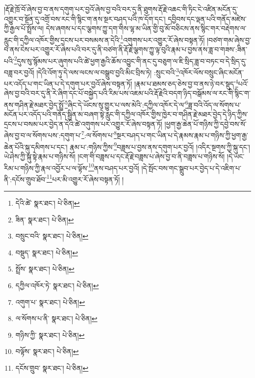 །རྡོ་རྗེ་ཁྲོ་བོ་ཞེས་བྱ་བ་ནས་དགུག་པར་བྱའོ་ཞེས་བྱ་བའི་བར་དུ་ནི་ཐུགས་རྡོ་རྗེ་འཆང་གི་ཏིང་ངེ་འཛིན་མངོན་དུ་འགྱུར་བ་སྔོན་དུ་འགྲོ་བས་རང་གི་སྙིང་ག་ནས་སྔར་བཤད་པའི་ཁ་དོག་དང་། དབྱིབས་དང་ལྡན་པའི་གནོད་མཛེས་ཀྱི་རྒྱལ་པོ་སྤྲོས་ལ། དེས་ཞགས་པ་དང་ལྕགས་ཀྱུ་དག་གིས་ལྷ་མ་ཡིན་གྱི་བུ་མོ་བཅིངས་ནས་སྙིང་གར་བརྡེགས་ལ་རླུང་གི་དཀྱིལ་འཁོར་གྱིས་དྲངས་པར་བསམས་ན་དེའི་\footnote{དེའི་ཚེ་  སྣར་ཐང་།  པེ་ཅིན། }འགུགས་པར་འགྱུར་རོ་ཞེས་བསྟན་ཏོ། །བཙག་གམ་ཞེས་བྱ་བ་ནས་ངེས་པར་འགྱུར་རོ་ཞེས་པའི་བར་དུ་ནི་བཙག་ནི་རྡོ་རྗེ་ལྕགས་ཀྱུ་ལྟ་བུའི་རྣམ་པ་བྱས་ནས་ཟླ་བ་གཟས་:ཟིན་པའི་\footnote{ཟིན་  སྣར་ཐང་།  པེ་ཅིན། }དུས་སུ་སྙོམས་པར་ཞུགས་པའི་ཚེ་ཕྱག་རྒྱའི་ཆོས་འབྱུང་གི་ནང་དུ་བཅུག་ལ་ཇི་སྲིད་ཟླ་བ་བཏང་བ་དེ་སྲིད་དུ་བཟླ་བར་བྱའོ། །དེའི་འོག་ཏུ་དེ་ལས་ལངས་ལ་བསྒྲུབ་བྱའི་མིང་བྲིས་ཏེ། :སྲུང་བའི་\footnote{བསྲུང་བའི་  སྣར་ཐང་།  པེ་ཅིན། }འཁོར་ལོས་བསྲུང་ཞིང་མངོན་པར་འདོད་པ་གང་ཡིན་པ་དེ་དགུག་པར་བྱའོ་ཞེས་བསྟན་ཏོ། །རྣམ་པ་ཐམས་ཅད་ཅེས་བྱ་བ་ནས་ཉེ་བར་སྡུད་\footnote{བསྡུད་  སྣར་ཐང་།  པེ་ཅིན། }པའོ་ཞེས་བྱ་བའི་བར་དུ་ནི་རེ་ཞིག་དང་པོ་བསྐྱེད་པའི་རིམ་པས་འཇམ་པའི་རྡོ་རྗེའི་བདག་ཉིད་བསྒོམས་ལ་རང་གི་སྙིང་ག་ནས་གཤིན་རྗེ་མཐར་བྱེད་སྤྲོ་\footnote{སྤྲོས་  སྣར་ཐང་།  པེ་ཅིན། }ཞིང་དེ་ཡོངས་སུ་གྱུར་པ་ལས་མེའི་:དཀྱིལ་འཁོར་དེ་ལ་\footnote{དཀྱིལ་འཁོར་ཏེ་  སྣར་ཐང་།  པེ་ཅིན། }ཟླ་བའི་འོད་ལ་སོགས་པ་མངོན་པར་འདོད་པའི་གནོད་སྦྱིན་མ་བཞག་སྟེ་རླུང་གི་དཀྱིལ་འཁོར་གྱིས་ཁྱེར་བ་གཤིན་རྗེ་མཐར་བྱེད་དེ་ཉིད་ཀྱིས་དྲངས་པ་བསམ་པར་བྱེད་ན་དེའི་ཚེ་འགུགས་པར་འགྱུར་རོ་ཞེས་བསྟན་ཏོ། །ཕྱག་རྒྱ་ཆེན་པོ་གཉིས་ཀྱི་དབྱེ་བས་སོ་ཞེས་བྱ་བ་ལ་སོགས་པས་:དགུག་པ་\footnote{འགུག་པ་  སྣར་ཐང་།  པེ་ཅིན། }:ལ་སོགས་པ་\footnote{ལ་སོགས་པ་ནི་  སྣར་ཐང་།  པེ་ཅིན། }སྔར་བཤད་པ་གང་ཡིན་པ་དེ་རྣམས་རྣམ་པ་གཉིས་ཀྱི་ཕྱག་རྒྱ་ཆེན་པོའི་སྐུ་དམིགས་པ་དང་། རྣམ་པ་:གཉིས་ཀྱིས་\footnote{གཉིས་ཀྱི་  སྣར་ཐང་།  པེ་ཅིན། }བཟླས་པ་བྱས་ནས་དགུག་པར་བྱའོ། །འདིར་སྔགས་ཀྱི་སྐུ་དང་། ཡེ་ཤེས་ཀྱི་སྐུ་སྟེ་རྣམ་པ་གཉིས་སོ། །ངག་གི་བཟླས་པ་དང་རྡོ་རྗེ་བཟླས་པ་ཞེས་བྱ་བ་ནི་བཟླས་པ་གཉིས་སོ། །དེ་ཡང་རིམ་པ་གཉིས་ཀྱི་རྣལ་འབྱོར་པ་ལ་ལྟོས་\footnote{བལྟོས་  སྣར་ཐང་།  པེ་ཅིན། }ནས་བཤད་པར་བྱའོ། །དེ་སྤོང་བས་གང་སྒྲུབ་པར་བྱེད་པ་དེ་འཇིག་པ་ནི་:དངོས་གྲུབ་ཐོབ་\footnote{དངོས་གྲུབ་  སྣར་ཐང་།  པེ་ཅིན། }པར་མི་འགྱུར་རོ་ཞེས་བསྟན་ཏོ། །
